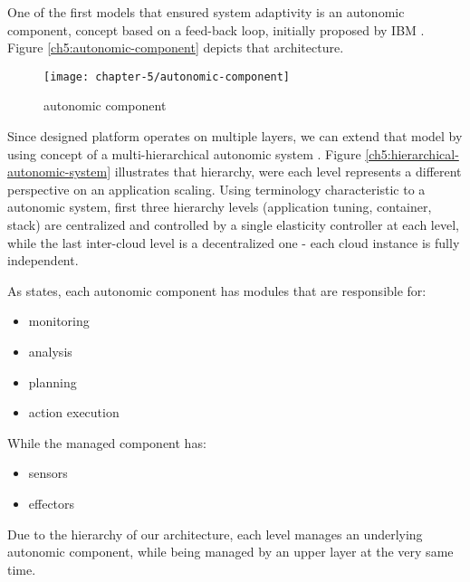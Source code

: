 One of the first models that ensured system adaptivity is an autonomic component, concept based on a feed-back loop, initially proposed by IBM \cite{IBM06}. Figure \ref{ch5:autonomic-component} depicts that architecture. 

\begin{figure}[!ht]
  \begin{center}
    \texttt{[image: chapter-5/autonomic-component]}
  \end{center}
  \caption{autonomic component}
  \label{design:autonomic-component}
\end{figure}

Since designed platform operates on multiple layers, we can extend that model by using concept of a multi-hierarchical autonomic system \cite{LiWoZh05}. Figure \ref{ch5:hierarchical-autonomic-system} illustrates that hierarchy, were each level represents a different perspective on an application scaling. Using terminology characteristic to a autonomic system, first three hierarchy levels (application tuning, container, stack) are centralized and controlled by a single elasticity controller at each level, while the last inter-cloud level is a decentralized one - each cloud instance is fully independent.

As \cite{IBM06} states, each autonomic component has modules that are responsible for:
\begin{itemize}
	\item monitoring
	\item analysis
	\item planning
	\item action execution
\end{itemize}

While the managed component has:
\begin{itemize}
	\item sensors
	\item effectors
\end{itemize}

Due to the hierarchy of our architecture, each level manages an underlying autonomic component, while being managed by an upper layer at the very same time.
